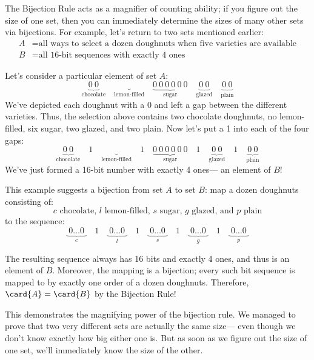 The Bijection Rule acts as a magnifier of counting ability; if you
figure out the size of one set, then you can immediately determine the
sizes of many other sets via bijections.  For example, let's return to
two sets mentioned earlier:
%
\begin{align*}
A & = \text{all ways to select a dozen doughnuts when five varieties are available} \\
B & = \text{all 16-bit sequences with exactly 4 ones}
\end{align*}

Let's consider a particular element of set $A$:
%
\[
\underbrace{0\ 0}_{\text{chocolate}} \quad
\underbrace{}_{\text{lemon-filled}} \quad
\underbrace{0\ 0\ 0\ 0\ 0\ 0}_{\text{sugar}} \quad
\underbrace{0\ 0}_{\text{glazed}} \quad
\underbrace{0\ 0}_{\text{plain}}
\]
%
We've depicted each doughnut with a $0$ and left a gap between the
different varieties.  Thus, the selection above contains two chocolate
doughnuts, no lemon-filled, six sugar, two glazed, and two plain.  Now
let's put a 1 into each of the four gaps:
%
\[
\underbrace{0\ 0}_{\text{chocolate}} \quad 1 \quad
\underbrace{}_{\text{lemon-filled}} \quad 1 \quad
\underbrace{0\ 0\ 0\ 0\ 0\ 0}_{\text{sugar}} \quad 1 \quad
\underbrace{0\ 0}_{\text{glazed}} \quad 1 \quad
\underbrace{0\ 0}_{\text{plain}}
\]
%
We've just formed a 16-bit number with exactly 4 ones--- an element of
$B$!

This example suggests a bijection from set $A$ to set $B$: map a dozen
doughnuts consisting of:
%
\[
\text{$c$ chocolate, $l$ lemon-filled, $s$ sugar, $g$ glazed, and $p$ plain}
\]
%
to the sequence:
%
\[
\underbrace{\ 0 \ldots 0\ }_{\text{$c$}} \quad 1 \quad
\underbrace{\ 0 \ldots 0\ }_{\text{$l$}} \quad 1 \quad
\underbrace{\ 0 \ldots 0\ }_{\text{$s$}} \quad 1 \quad
\underbrace{\ 0 \ldots 0\ }_{\text{$g$}} \quad 1 \quad
\underbrace{\ 0 \ldots 0\ }_{\text{$p$}}
\]

The resulting sequence always has 16 bits and exactly 4
ones, and thus is an element of $B$.  Moreover, the mapping is a
bijection; every such bit sequence is mapped to by exactly one order
of a dozen doughnuts.  Therefore, $\card{A} = \card{B}$ by the
Bijection Rule!

This demonstrates the magnifying power of the bijection rule.  We
managed to prove that two very different sets are actually the same
size--- even though we don't know exactly how big either one is.  But
as soon as we figure out the size of one set, we'll immediately know
the size of the other.

